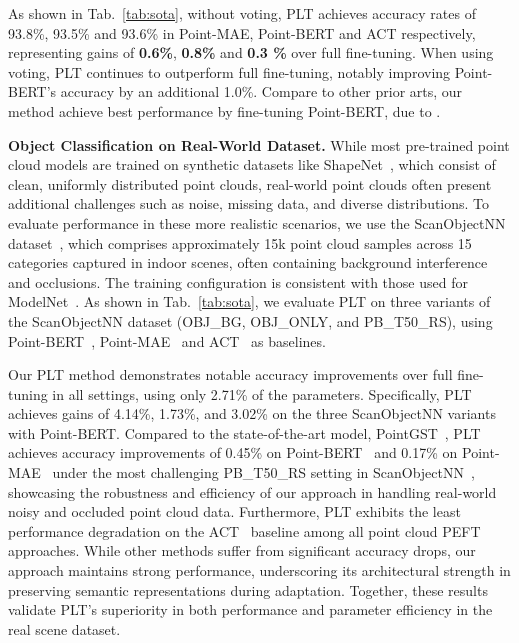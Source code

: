 As shown in Tab.~\ref{tab:sota}, without voting, PLT achieves accuracy rates of 93.8\%, 93.5\% and 93.6\% in Point-MAE, Point-BERT and ACT respectively, representing gains of \textbf{0.6\%}, \textbf{0.8\%} and \textbf{0.3 \%} over full fine-tuning. When using voting, PLT continues to outperform full fine-tuning, notably improving Point-BERT’s accuracy by an additional 1.0\%. Compare to other prior arts, our method achieve best performance by fine-tuning Point-BERT, due to . 

\textbf{Object Classification on Real-World Dataset.} While most pre-trained point cloud models are trained on synthetic datasets like ShapeNet~\cite{chang2015shapenet}, which consist of clean, uniformly distributed point clouds, real-world point clouds often present additional challenges such as noise, missing data, and diverse distributions. To evaluate performance in these more realistic scenarios, we use the ScanObjectNN dataset~\cite{uy2019revisiting}, which comprises approximately 15k point cloud samples across 15 categories captured in indoor scenes, often containing background interference and occlusions. The training configuration is consistent with those used for ModelNet~\cite{wu20153d}. As shown in Tab.~\ref{tab:sota}, we evaluate PLT on three variants of the ScanObjectNN dataset (OBJ\_BG, OBJ\_ONLY, and PB\_T50\_RS), using Point-BERT~\cite{yu2022point},  Point-MAE~\cite{pang2022masked} and ACT~\cite{dong2022autoencoders} as baselines.

Our PLT method demonstrates notable accuracy improvements over full fine-tuning in all settings, using only 2.71\% of the parameters. 
Specifically, PLT achieves gains of 4.14\%, 1.73\%, and 3.02\% on the three ScanObjectNN variants with Point-BERT. 
Compared to the state-of-the-art model, PointGST~\cite{liang2024parameter}, PLT achieves accuracy improvements of 0.45\% on Point-BERT~\cite{yu2022point} and 0.17\% on Point-MAE~\cite{pang2022masked} under the most challenging PB\_T50\_RS setting in ScanObjectNN~\cite{uy2019revisiting}, showcasing the robustness and efficiency of our approach in handling real-world noisy and occluded point cloud data. 
Furthermore, PLT exhibits the least performance degradation on the ACT~\cite{dong2022autoencoders} baseline among all point cloud PEFT approaches. 
While other methods suffer from significant accuracy drops, our approach maintains strong performance, underscoring its architectural strength in preserving semantic representations during adaptation. 
Together, these results validate PLT’s superiority in both performance and parameter efficiency in the real scene dataset.

